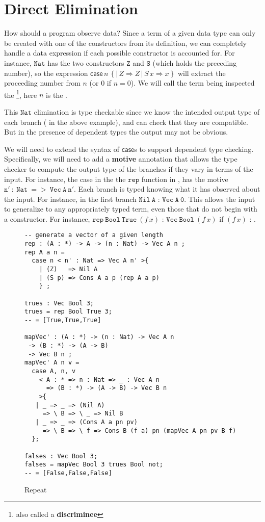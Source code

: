 \section{Direct Elimination}

How should a program observe data?
Since a term of a given data type can only be created with one of the constructors from its definition, we can completely handle a data expression if each possible constructor is accounted for.
For instance, $\mathtt{Nat}$ has the two constructors $\mathtt{Z}$ and $\mathtt{S}$ (which holds the preceding number), so the expression $\mathsf{case}\,n\,\left\{ |\,Z\Rightarrow Z\,|\,S\,x\Rightarrow x\right\}$ will extract the proceeding number from $n$ (or $0$ if $n=0$).
We will call the term being inspected the \textbf{\scrut{}}\footnote{also called a \textbf{discriminee}}, here $n$ is the \scrut{}.
 
This $\mathtt{Nat}$ elimination is type checkable since we know the intended output type of each branch (\Nat{} in the above example), and can check that they are compatible.
But in the presence of dependent types the output may not be obvious.

We will need to extend the syntax of $\mathsf{case}$s to support dependent type checking.
Specifically, we will need to add a \textbf{motive} annotation that allows the type checker to compute the output type of the branches if they vary in terms of the input.
For instance, the case in the the $\mathtt{rep}$ function in , has the motive $\mathtt{n'\ :\ Nat\ =>\ Vec\ A\ n'}$.
Each branch is typed knowing what it has observed about the input.
For instance, in the first branch $\mathtt{Nil\ A}$ :  $\mathtt{Vec\ A\ 0}$.
This allows the input to generalize to any appropriately typed term, even those that do not begin with a constructor.
For instance, $\mathtt{rep\ Bool\ True\ }(f\,x)$ : $\mathtt{Vec\ Bool\ }(f\,x)$ if $(f\,x)$ : \Nat{}.

\begin{figure}
\begin{lstlisting}[basicstyle={\ttfamily\small}]
-- generate a vector of a given length
rep : (A : *) -> A -> (n : Nat) -> Vec A n ;
rep A a n = 
  case n < n' : Nat => Vec A n' >{
    | (Z)   => Nil A
    | (S p) => Cons A a p (rep A a p)
    } ;

trues : Vec Bool 3;
trues = rep Bool True 3;
-- = [True,True,True]

mapVec' : (A : *) -> (n : Nat) -> Vec A n 
 -> (B : *) -> (A -> B)
 -> Vec B n ;
mapVec' A n v =
  case A, n, v 
    < A : * => n : Nat => _ : Vec A n 
      => (B : *) -> (A -> B) -> Vec B n 
    >{
   | _ => _ => (Nil A)          
     => \ B => \ _ => Nil B
   | _ => _ => (Cons A a pn pv) 
     => \ B => \ f => Cons B (f a) pn (mapVec A pn pv B f)
  };

falses : Vec Bool 3;
falses = mapVec Bool 3 trues Bool not;
-- = [False,False,False]
\end{lstlisting}
\caption{Repeat}
\label{fig:data-elim-examples}
\end{figure}

